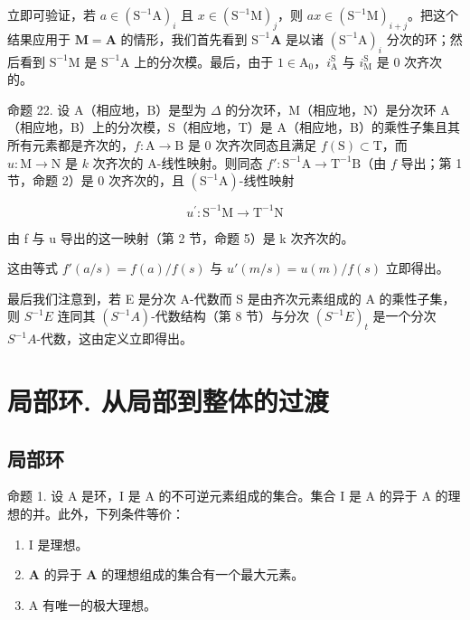 立即可验证，若 \(a \in (\mathrm{S}^{-1}\mathrm{A})_i\) 且 \(x \in (\mathrm{S}^{-1}\mathrm{M})_j\)，则 \(ax \in (\mathrm{S}^{-1}\mathrm{M})_{i+j}\)。把这个结果应用于 \(\mathbf{M} = \mathbf{A}\) 的情形，我们首先看到 \(\mathrm{S}^{-1}\mathbf{A}\) 是以诸 \((\mathrm{S}^{-1}\mathrm{A})_i\) 分次的环；然后看到 \(\mathrm{S}^{-1}\mathrm{M}\) 是 \(\mathrm{S}^{-1}\mathrm{A}\) 上的分次模。最后，由于 \(1 \in \mathrm{A}_0\)，\(i_{\mathrm{A}}^{\mathrm{S}}\) 与 \(i_{\mathrm{M}}^{\mathrm{S}}\) 是 0 次齐次的。

命题 22. 设 A（相应地，B）是型为 \(\Delta\) 的分次环，M（相应地，N）是分次环 A（相应地，B）上的分次模，S（相应地，T）是 A（相应地，B）的乘性子集且其所有元素都是齐次的，\(f: \mathrm{A} \to \mathrm{B}\) 是 0 次齐次同态且满足 \(f(\mathrm{S}) \subset \mathrm{T}\)，而 \(u: \mathrm{M} \to \mathrm{N}\) 是 \(k\) 次齐次的 A-线性映射。则同态 \(f': \mathrm{S}^{-1}\mathrm{A} \to \mathrm{T}^{-1}\mathrm{B}\)（由 \(f\) 导出；第 1 节，命题 2）是 0 次齐次的，且 \((\mathrm{S}^{-1}\mathrm{A})\)-线性映射

\[
u ^ {\prime} \colon \mathrm{S} ^ {- 1} \mathrm{M} \rightarrow \mathrm{T} ^ {- 1} \mathrm{N}
\]

由 f 与 u 导出的这一映射（第 2 节，命题 5）是 k 次齐次的。

这由等式 \(f'(a / s) = f(a) / f(s)\) 与 \(u'(m / s) = u(m) / f(s)\) 立即得出。

最后我们注意到，若 E 是分次 A-代数而 S 是由齐次元素组成的 A 的乘性子集，则 \(S^{-1}E\) 连同其 \((S^{-1}A)\)-代数结构（第 8 节）与分次 \((S^{-1}E)_{t}\) 是一个分次 \(S^{-1}A\)-代数，这由定义立即得出。

\section{局部环. 从局部到整体的过渡}

\subsection{局部环}

命题 1. 设 A 是环，I 是 A 的不可逆元素组成的集合。集合 I 是 A 的异于 A 的理想的并。此外，下列条件等价：

\begin{enumerate}
\def\labelenumi{(\alph{enumi})}
\item
  I 是理想。
\item
  \(\mathbf{A}\) 的异于 \(\mathbf{A}\) 的理想组成的集合有一个最大元素。
\item
  A 有唯一的极大理想。
\end{enumerate}

